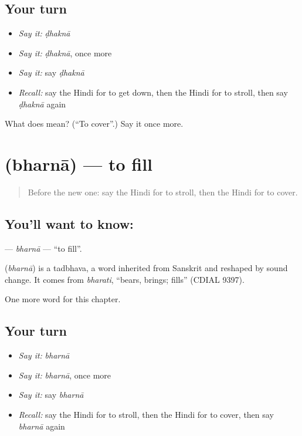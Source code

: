 \subsection*{Your turn}
\begin{itemize}
\raggedright
  \item \emph{Say it:} \emph{ḍhaknā}
  \item \emph{Say it:} \emph{ḍhaknā}, once more
  \item \emph{Say it:} say \emph{ḍhaknā}
  \item \emph{Recall:} say the Hindi for to get down, then the Hindi for to stroll, then say \emph{ḍhaknā} again
\end{itemize}

\begin{tcolorbox}[breakable,colback=teal!4,colframe=teal!35!black,title={Before you move on}]
What does  mean? (\textquotedblleft{}To cover\textquotedblright{}.) Say it once more.
\end{tcolorbox}
\section[\texorpdfstring{\hi{भरना} (bharnā)}{भरना (bharnā)}]{ (bharnā) — to fill}

\label{lesson:HI-C173-bharna}



\begin{quote}
Before the new one: say the Hindi for to stroll, then the Hindi for to cover.
\end{quote}

\subsection*{You'll want to know: }
\textbf{} — \emph{bharnā} — \textquotedblleft{}to fill\textquotedblright{}.

\begin{cousinweb}
\textbf{} (\emph{bharnā}) is a tadbhava, a word inherited from Sanskrit and reshaped by sound change. It comes from \emph{bharati}, \textquotedblleft{}bears, brings; fills\textquotedblright{} (CDIAL 9397).
\end{cousinweb}

\begin{grammarlens}[title={What you've built}]
One more word for this chapter.
\end{grammarlens}

\subsection*{Your turn}
\begin{itemize}
\raggedright
  \item \emph{Say it:} \emph{bharnā}
  \item \emph{Say it:} \emph{bharnā}, once more
  \item \emph{Say it:} say \emph{bharnā}
  \item \emph{Recall:} say the Hindi for to stroll, then the Hindi for to cover, then say \emph{bharnā} again
\end{itemize}

